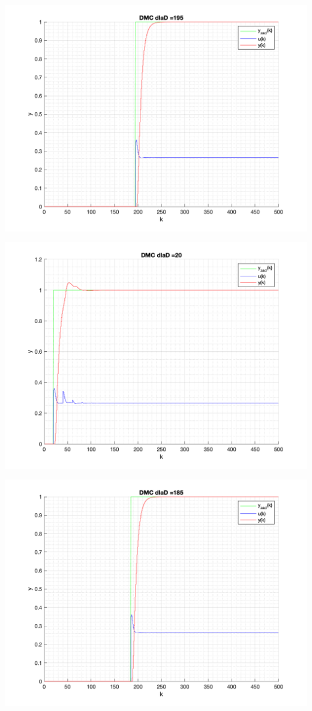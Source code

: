 \documentclass[a4paper, 11pt]{article}
\begin{document}
\begin{enumerate}
 \includegraphics[width=\linewidth]{./ModelsP4_D/P4_DMC_D_195_png.png} 
 
 \includegraphics[width=\linewidth]{./ModelsP4_D/P4_DMC_D_20_png.png} 
 
 \includegraphics[width=\linewidth]{./ModelsP4_D/P4_DMC_D_185_png.png} 
 

\end{enumerate}
\end{document}
